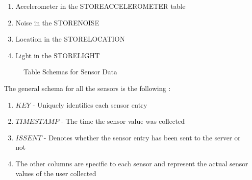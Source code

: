 \begin{enumerate}
	\item Accelerometer in the STOREACCELEROMETER table
	\item Noise in the STORENOISE
    \item Location in the  STORELOCATION
    \item Light in the  STORELIGHT
\end{enumerate}

\begin{figure}[htp]
\hspace{1em}
%
\caption{Table Schemas for Sensor Data}
\label{fig:ts2}
\end{figure}

The general schema for all the sensors is the following :

\begin{enumerate}
	\item $KEY$ - Uniquely identifies each sensor entry
	\item $TIMESTAMP$ - The time the sensor value was collected
    \item $ISSENT$ - Denotes whether the sensor entry has been sent to the server or not
    \item The other columns are specific to each sensor and represent the actual sensor values of the user collected
\end{enumerate}

